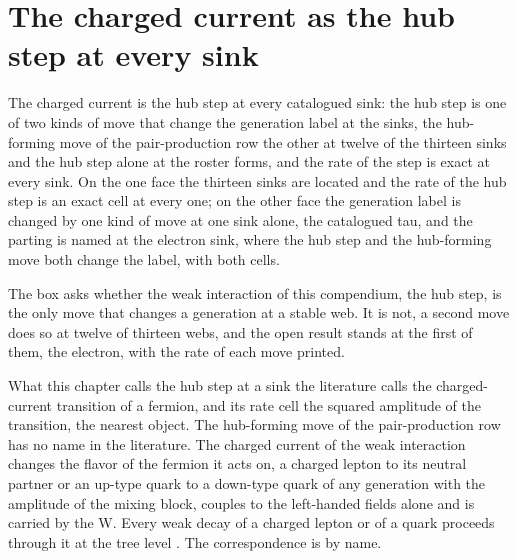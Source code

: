 \section{The charged current as the hub step at every sink}\label{mod:VI-4-D538994-w-cchs}
\begin{chwall}
The charged current is the hub step at every catalogued sink: the hub step is one of two kinds of move that change the generation label at the sinks, the hub-forming move of the pair-production row the other at twelve of the thirteen sinks and the hub step alone at the roster forms, and the rate of the step is exact at every sink. On the one face the thirteen sinks are located and the rate of the hub step is an exact cell at every one; on the other face the generation label is changed by one kind of move at one sink alone, the catalogued tau, and the parting is named at the electron sink, where the hub step and the hub-forming move both change the label, with both cells.
\end{chwall}
\chdeps{}{}
The box asks whether the weak interaction of this compendium, the hub step, is the only move that changes a generation at a stable web. It is not, a second move does so at twelve of thirteen webs, and the open result stands at the first of them, the electron, with the rate of each move printed.
\begin{chbridge}
What this chapter calls the hub step at a sink the literature calls the charged-current transition of a fermion, and its rate cell the squared amplitude of the transition, the nearest object. The hub-forming move of the pair-production row has no name in the literature. The charged current of the weak interaction changes the flavor of the fermion it acts on, a charged lepton to its neutral partner or an up-type quark to a down-type quark of any generation with the amplitude of the mixing block, couples to the left-handed fields alone and is carried by the W. Every weak decay of a charged lepton or of a quark proceeds through it at the tree level \cite{Fermi1934,Weinberg1967,Cabibbo1963}. The correspondence is by name.
\end{chbridge}
